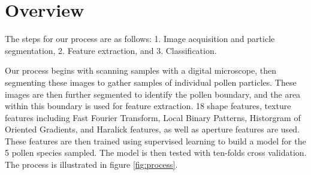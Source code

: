 \section{Overview} 

The steps for our process are as follows: 1. Image acquisition and particle segmentation, 2. Feature extraction, and 3. Classification.

Our process begins with scanning samples with a digital microscope, then segmenting these images to gather samples of individual pollen particles. These images are then further segmented to identify the pollen boundary, and the area within this boundary is used for feature extraction. 18 shape features, texture features including Fast Fourier Transform, Local Binary Patterns, Historgram of Oriented Gradients, and Haralick features, as well as aperture features are used. These features are then trained using supervised learning to build a model for the 5 pollen species sampled. The model is then tested with ten-folds cross validation. The process is illustrated in figure \ref{fig:process}. 
    
    
    
    
    
    
    
    
    
    
    
    
  
  
  
  
  
  
  
  
  
  
  
  